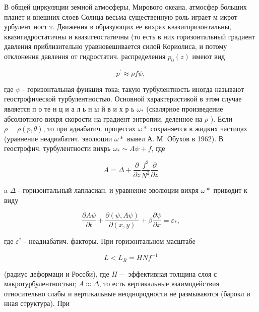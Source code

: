 \documentclass[10pt]{article}
\begin{document}
В общей циркуляции земной атмосферы, Мирового океана, атмосфер больших планет и внешних слоев Солнца весьма существенную роль играет м икрот урбулент ност т. Движения в образующих ее вихрях квазигоризонтальны, квазигидростатичны и квазигеостатичны (то есть в них горизонтальный градиент давления приблизительно уравновешивается силой Кориолиса, и потому отклонения давления от гидростатич. распределения $p_{0}(z)$ имеют вид



\[

p^{\prime} \approx \rho f \psi,

\]



где $\psi$ - горизонтальная функция тока; такую турбулентность иногда называют геострофической турбулентностью. Основной характеристикой в этом случае является п о те н ц и а л ь н ы й в и х р ь $\omega_{*}$ (скалярное произведение абсолютного вихря скорости на градиент энтропии, деленное на $\rho$ ). Если $\rho=\rho(p, \theta)$, то при адиабатич. процессах $\omega *$ сохраняется в жидких частицах (уравнение неадиабатич. эволюции $\omega *$ вывел А. М. Обухов в 1962). В геострофич. турбулентности вихрь $\omega_{*} \sim A \psi+f$, где



\[

A=\Delta+\frac{\partial}{\partial z} \frac{f^{2}}{N^{2}} \frac{\partial}{\partial z}

\]



a $\Delta$ - горизонтальный лапласиан, и уравнение эволюции вихря $\omega *$ приводит к виду



\[

\frac{\partial A \psi}{\partial t}+\frac{\partial(\psi, A \psi)}{\partial(x, y)}+\beta \frac{\partial \psi}{\partial x}=\varepsilon_{*},

\]



где $\varepsilon^{*}$ - неадиабатич. факторы. При горизонтальном масштабе



\[

L<L_{R}=H N f^{-1}

\]



(радиус деформаци и Россби), где $H-$ эффективная толщина слоя с макротурбулентностью; $A \approx \Delta$, то есть вертикальные взаимодействия относительно слабы и вертикальные неоднородности не размываются (барокл и нная структура). При
\end{document}
